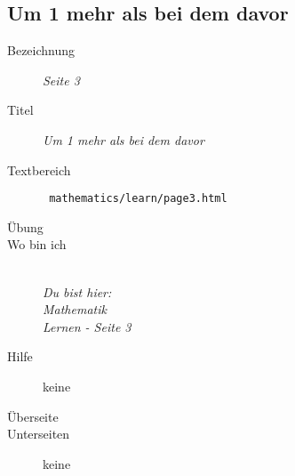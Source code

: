 %
%


\subsection{ Um 1 mehr als bei dem davor }
\label{cha:math-learn-page3}
\begin{description}
  \item[Bezeichnung] \emph{ Seite 3 }
  \item[Titel] \emph{ Um 1 mehr als bei dem davor }
  \item[Textbereich] \texttt{ mathematics/learn/page3.html }
  \item[Übung] 
  \item[Wo bin ich] \emph{\\Du bist hier:\\Mathematik\\Lernen - Seite 3 }
  \item[Hilfe] keine
  \item[Überseite] 
  \item[Unterseiten] keine
\end{description}


